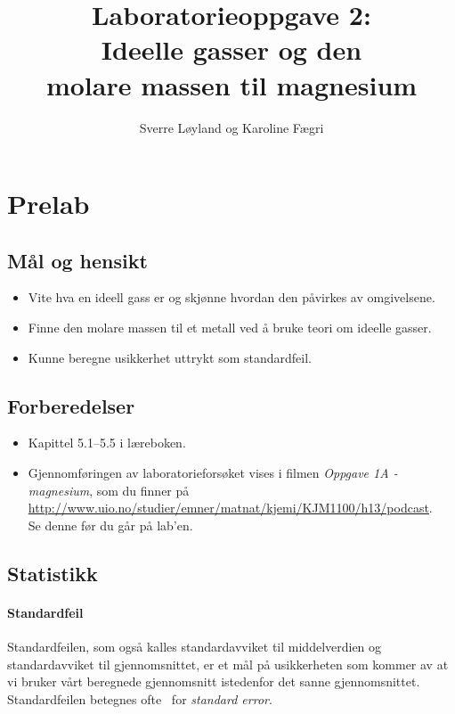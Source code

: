 
 

\title{Laboratorieoppgave 2:\\
	Ideelle gasser og den \\
	molare massen til magnesium}
\author{Sverre Løyland og Karoline Fægri}
\date{}


	
	\maketitle
	
	\section{Prelab}
	
	\subsection{Mål og hensikt}
	\begin{itemize}
		\item Vite hva en ideell gass er og skjønne hvordan den påvirkes av omgivelsene.
		\item Finne den molare massen til et metall ved å bruke teori om ideelle gasser.
		\item Kunne beregne usikkerhet uttrykt som standardfeil. 
	\end{itemize}
	
	\subsection{Forberedelser}
	\begin{itemize}
		\item Kapittel 5.1--5.5 i læreboken.
		\item Gjennomføringen av laboratorieforsøket vises i filmen \emph{Oppgave 1A - magnesium}, som du finner på \\ \url{http://www.uio.no/studier/emner/matnat/kjemi/KJM1100/h13/podcast}. \\
		Se denne før du går på lab'en.
	\end{itemize}
	
	\subsection{Statistikk}
	\paragraph{Standardfeil}
	Standardfeilen, som også kalles standardavviket til middelverdien og standardavviket til gjennomsnittet, er et mål på usikkerheten som kommer av at vi bruker vårt beregnede gjennomsnitt istedenfor det sanne gjennomsnittet. Standardfeilen betegnes ofte \SE\ for \emph{standard error}.
	

